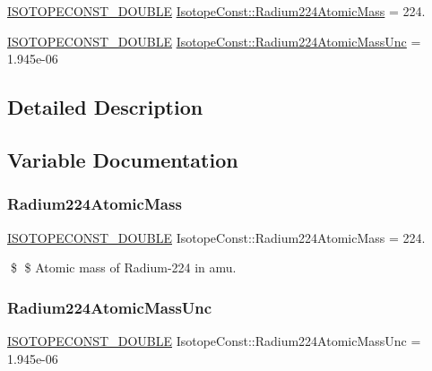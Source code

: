 \begin{DoxyCompactItemize}
\item 
\mbox{\hyperlink{group___isotope_const-_macros_ga8f45a7272ce02c0b4c65c44636ed719a}{I\+S\+O\+T\+O\+P\+E\+C\+O\+N\+S\+T\+\_\+\+D\+O\+U\+B\+LE}} \mbox{\hyperlink{group___isotope_const-_radium-_ra224_gaccdcf8ca2a8401a1edccae8c2f973f71}{Isotope\+Const\+::\+Radium224\+Atomic\+Mass}} = 224.
\item 
\mbox{\hyperlink{group___isotope_const-_macros_ga8f45a7272ce02c0b4c65c44636ed719a}{I\+S\+O\+T\+O\+P\+E\+C\+O\+N\+S\+T\+\_\+\+D\+O\+U\+B\+LE}} \mbox{\hyperlink{group___isotope_const-_radium-_ra224_gadf04c4980d91459532439cf6e186a6d5}{Isotope\+Const\+::\+Radium224\+Atomic\+Mass\+Unc}} = 1.\+945e-\/06
\end{DoxyCompactItemize}


\subsection{Detailed Description}


\subsection{Variable Documentation}
\mbox{\label{group___isotope_const-_radium-_ra224_gaccdcf8ca2a8401a1edccae8c2f973f71}} 
\subsubsection{\texorpdfstring{Radium224\+Atomic\+Mass}{Radium224AtomicMass}}
{\footnotesize\ttfamily \mbox{\hyperlink{group___isotope_const-_macros_ga8f45a7272ce02c0b4c65c44636ed719a}{I\+S\+O\+T\+O\+P\+E\+C\+O\+N\+S\+T\+\_\+\+D\+O\+U\+B\+LE}} Isotope\+Const\+::\+Radium224\+Atomic\+Mass = 224.}

\$ \$ Atomic mass of Radium-\/224 in amu. \mbox{\label{group___isotope_const-_radium-_ra224_gadf04c4980d91459532439cf6e186a6d5}} 
\subsubsection{\texorpdfstring{Radium224\+Atomic\+Mass\+Unc}{Radium224AtomicMassUnc}}
{\footnotesize\ttfamily \mbox{\hyperlink{group___isotope_const-_macros_ga8f45a7272ce02c0b4c65c44636ed719a}{I\+S\+O\+T\+O\+P\+E\+C\+O\+N\+S\+T\+\_\+\+D\+O\+U\+B\+LE}} Isotope\+Const\+::\+Radium224\+Atomic\+Mass\+Unc = 1.\+945e-\/06}

